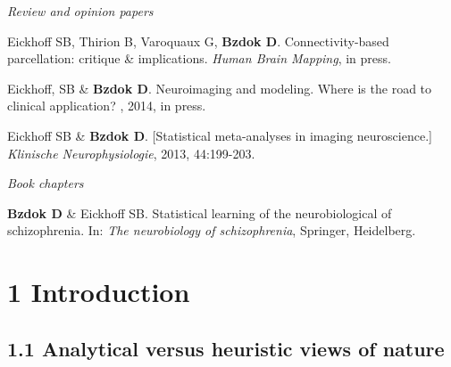 \documentclass[authoryear,review,3p]{elsarticle}
\begin{document}
\bigskip
\textit{Review and opinion papers}

Eickhoff SB, Thirion B, Varoquaux G, \textbf{Bzdok D}.
Connectivity-based parcellation: critique \& implications.
\textit{Human Brain Mapping}, in press.

Eickhoff, SB \& \textbf{Bzdok D}.
Neuroimaging and modeling. Where is the road to clinical application?
, 2014, in press. 

Eickhoff SB \& \textbf{Bzdok D}.
[Statistical meta-analyses in imaging neuroscience.]
\textit{Klinische Neurophysiologie}, 2013, 44:199-203.

\bigskip
\textit{Book chapters}

\linebreak
\textbf{Bzdok D} \& Eickhoff SB.
Statistical learning of the neurobiological of schizophrenia.
In: \textit{The neurobiology of schizophrenia}, Springer, Heidelberg.

\newpage

\section*{1 Introduction}

\subsection*{1.1 Analytical versus heuristic views of nature}
\end{document}
